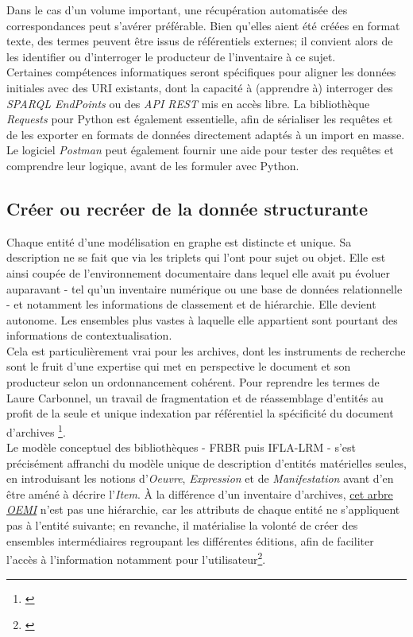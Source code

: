 \documentclass[a4paper,12pt,twoside]{book}
\begin{document}
Dans le cas d'un volume important, une récupération automatisée des correspondances peut s'avérer préférable. Bien qu'elles aient été créées en format texte, des termes peuvent être issus de référentiels externes; il convient alors de les identifier ou d'interroger le producteur de l'inventaire à ce sujet.\\

Certaines compétences informatiques seront spécifiques pour aligner les données initiales avec des URI existants, dont la capacité à (apprendre à) interroger des \textit{SPARQL EndPoints} ou des \textit{API REST} mis en accès libre. La bibliothèque \textit{Requests} pour Python est également essentielle, afin de sérialiser les requêtes et de les exporter en formats de données directement adaptés à un import en masse. Le logiciel \textit{Postman} peut également fournir une aide pour tester des requêtes et comprendre leur logique, avant de les formuler avec Python. 



\subsection{Créer ou recréer de la donnée structurante}

Chaque entité d'une modélisation en graphe est distincte et unique. Sa description ne se fait que via les triplets qui l'ont pour sujet ou objet. Elle est ainsi coupée de l'environnement documentaire dans lequel elle avait pu évoluer auparavant - tel qu'un inventaire numérique ou une base de données relationnelle - et notamment les informations de classement et de hiérarchie. Elle devient autonome. Les ensembles plus vastes à laquelle elle appartient sont pourtant des informations de contextualisation.\\

Cela est particulièrement vrai pour les archives, dont les instruments de recherche sont le fruit d'une expertise qui met en perspective le document et son producteur selon un ordonnancement cohérent. Pour reprendre les termes de Laure Carbonnel, un \og travail de fragmentation et de réassemblage d'entités \fg{} au profit de la seule et unique indexation par référentiel \og [effacerait] la spécificité du document d'archives \fg\footnote{\cite[p.~18]{carbonnelArchivesSciencesHumaines2017}}.\\

Le modèle conceptuel des bibliothèques - FRBR puis IFLA-LRM - s'est précisément affranchi du modèle unique de description d'entités matérielles seules, en introduisant les notions d'\textit{Oeuvre}, \textit{Expression} et de \textit{Manifestation} avant d'en être améné à décrire l'\textit{Item}. À la différence d'un inventaire d'archives, \hyperref[mod-ifla-lrm]{cet arbre \textit{OEMI}} n'est pas une hiérarchie, car les attributs de chaque entité ne s'appliquent pas à l'entité suivante; en revanche, il matérialise la volonté de créer des ensembles intermédiaires regroupant les différentes éditions, afin de faciliter l'accès à l'information notamment pour l'utilisateur\footnote{\cite{bibliothequenationaledefranceProgrammeNationalTransition2023}}.\\
\end{document}

